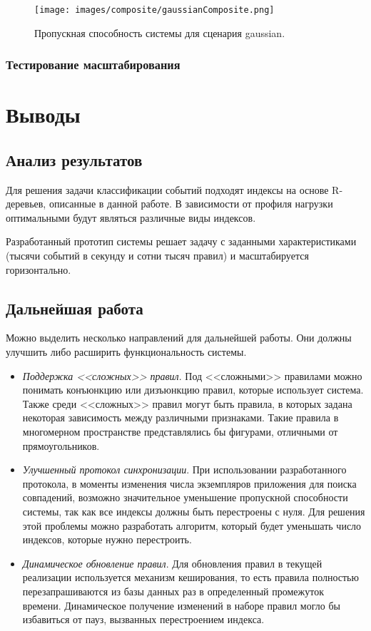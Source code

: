 \documentclass[14pt]{article}
\begin{document}
\begin{figure}[h!]
    \centering
    \texttt{[image: images/composite/gaussianComposite.png]}
    \caption{Пропускная способность системы для сценария gaussian.}
    \label{fig:gaussianComposite}
\end{figure}

\subsubsection{Тестирование масштабирования}


\section{Выводы}
\subsection{Анализ результатов}
Для решения задачи классификации событий подходят индексы на основе R-деревьев, описанные в данной работе. В зависимости от профиля нагрузки оптимальными будут являться различные виды индексов.

Разработанный прототип системы решает задачу с заданными характеристиками (тысячи событий в секунду и сотни тысяч правил) и масштабируется горизонтально.

\subsection{Дальнейшая работа}
Можно выделить несколько направлений для дальнейшей работы. Они должны улучшить либо расширить функциональность системы.
\begin{itemize}
    \item \emph{Поддержка <<сложных>> правил}. Под <<сложными>> правилами можно понимать конъюнкцию или дизъюнкцию правил, которые использует система. Также среди <<сложных>> правил могут быть правила, в которых задана некоторая зависимость между различными признаками. Такие правила в многомерном пространстве представлялись бы фигурами, отличными от прямоугольников.
    \item \emph{Улучшенный протокол синхронизации}. При использовании разработанного протокола, в моменты изменения числа экземпляров приложения для поиска совпадений, возможно значительное уменьшение пропускной способности системы, так как все индексы должны быть перестроены с нуля. Для решения этой проблемы можно разработать алгоритм, который будет уменьшать число индексов, которые нужно перестроить.
    \item \emph{Динамическое обновление правил}. Для обновления правил в текущей реализации используется механизм кеширования, то есть правила полностью перезапрашиваются из базы данных раз в определенный промежуток времени. Динамическое получение изменений в наборе правил могло бы избавиться от пауз, вызванных перестроением индекса.
\end{itemize}
\newpage
\end{document}
